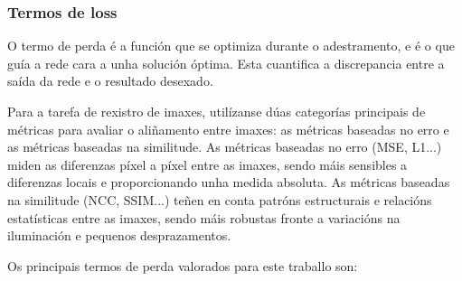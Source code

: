 \subsubsection{Termos de loss}
\label{subsubsec:Termos de loss}

O termo de perda é a función que se optimiza durante o adestramento, e é o que guía a rede cara a unha solución óptima.
Esta cuantifica a discrepancia entre a saída da rede e o resultado desexado.

Para a tarefa de rexistro de imaxes, utilízanse dúas categorías principais de métricas para avaliar o aliñamento entre imaxes: 
as métricas baseadas no erro e as métricas baseadas na similitude. As métricas baseadas no erro (MSE, L1...) miden as diferenzas píxel a píxel entre as imaxes, 
sendo máis sensibles a diferenzas locais e proporcionando unha medida absoluta. 
As métricas baseadas na similitude (NCC, SSIM...) teñen en conta patróns estructurais e relacións estatísticas entre as imaxes, sendo máis robustas fronte a variacións na iluminación e pequenos desprazamentos.
\cite{simmetric}

Os principais termos de perda valorados para este traballo son:

